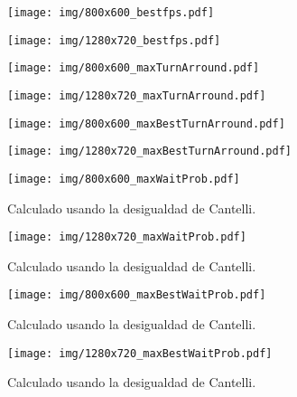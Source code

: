\begin{figure}[h]

	\texttt{[image: img/800x600\_bestfps.pdf]}
	\caption{}

\end{figure}

\begin{figure}[h]

	\texttt{[image: img/1280x720\_bestfps.pdf]}
	\caption{}

\end{figure}

\begin{figure}[h]

	\texttt{[image: img/800x600\_maxTurnArround.pdf]}
	\caption{}

\end{figure}

\begin{figure}[h]

	\texttt{[image: img/1280x720\_maxTurnArround.pdf]}
	\caption{}

\end{figure}

\begin{figure}[h]

	\texttt{[image: img/800x600\_maxBestTurnArround.pdf]}
	\caption{}

\end{figure}

\begin{figure}[h]

	\texttt{[image: img/1280x720\_maxBestTurnArround.pdf]}
	\caption{}

\end{figure}

\begin{figure}[h]

	\texttt{[image: img/800x600\_maxWaitProb.pdf]}
	\caption{Calculado usando la desigualdad de Cantelli.}

\end{figure}

\begin{figure}[h]

	\texttt{[image: img/1280x720\_maxWaitProb.pdf]}
	\caption{Calculado usando la desigualdad de Cantelli.}

\end{figure}

\begin{figure}[h]

	\texttt{[image: img/800x600\_maxBestWaitProb.pdf]}
	\caption{Calculado usando la desigualdad de Cantelli.}

\end{figure}

\begin{figure}[h]

	\texttt{[image: img/1280x720\_maxBestWaitProb.pdf]}
	\caption{Calculado usando la desigualdad de Cantelli.}

\end{figure}

